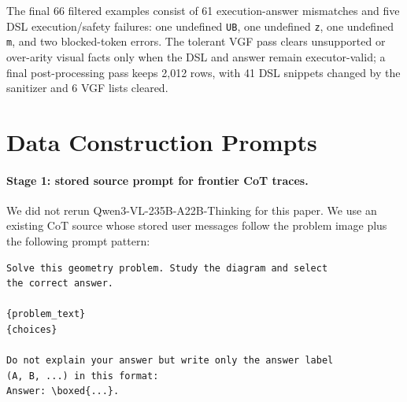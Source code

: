 \documentclass{article}
\begin{document}
The final 66 filtered examples consist of 61 execution-answer mismatches and five DSL execution/safety failures: one undefined \texttt{UB}, one undefined \texttt{z}, one undefined \texttt{m}, and two blocked-token errors. The tolerant VGF pass clears unsupported or over-arity visual facts only when the DSL and answer remain executor-valid; a final post-processing pass keeps 2,012 rows, with 41 DSL snippets changed by the sanitizer and 6 VGF lists cleared.

\section{Data Construction Prompts}
\label{app:prompts}

\paragraph{Stage 1: stored source prompt for frontier CoT traces.}
We did not rerun Qwen3-VL-235B-A22B-Thinking for this paper. We use an existing CoT source whose stored user messages follow the problem image plus the following prompt pattern:
\begin{verbatim}
Solve this geometry problem. Study the diagram and select
the correct answer.

{problem_text}
{choices}

Do not explain your answer but write only the answer label
(A, B, ...) in this format:
Answer: \boxed{...}.
\end{verbatim}
\end{document}
